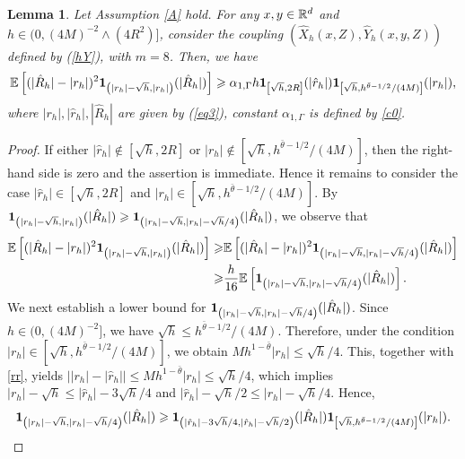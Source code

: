 \documentclass[aap]{imsart}
\theoremstyle{plain}
\newtheorem{lemma}[theorem]{Lemma}
\theoremstyle{definition}
\begin{document}
\begin{lemma}\label{2mom}
Let Assumption \ref{A} hold. For any $x, y\in\mathbb{R}^d$ and $h\in (0, (4M)^{-2}\wedge (4R^2)]$, consider the coupling $(\hat{X}_h(x,Z), \hat{Y}_h(x, y,Z))$ defined by (\ref{hY}), with \(m=8\). Then, we have
$$\mathbb{E}\left[(|\hat{R}_h|-|r_h|)^2{\bf 1}_{\left(|r_h|-\sqrt{h},|r_h|\right)}(|\hat{R}_h|)\right]\geqslant \alpha_{1, \Gamma}h{\bf 1}_{\left[\sqrt{h}, 2R\right]}(|\hat{r}_h|){\bf 1}_{\left[\sqrt{h}, h^{\bar{\theta}-1/2}/(4M)\right]}(|r_h|),$$
where $|r_h|, |\hat{r}_h|, |\hat{R}_h|$ are given by (\ref{eq3}), constant \(\alpha_{1,\Gamma}\) is defined by \eqref{c0}.
\end{lemma}
\begin{proof}
If either \(|\hat r_h|\notin[\sqrt h,2R]\) or \(|r_h|\notin[\sqrt h,h^{\bar\theta-1/2}/(4M)]\),
then the right-hand side is zero and the assertion is immediate. Hence it remains to consider the case \(|\hat r_h|\in[\sqrt h,2R]\) and \(|r_h|\in[\sqrt h,h^{\bar\theta-1/2}/(4M)]\).
By \({\bf 1}_{\left(|r_h|-\sqrt{h}, |r_h|\right)}(|\hat{R}_h|)\geqslant {\bf 1}_{\left(|r_h|-\sqrt{h}, |r_h|-\sqrt{h}/4\right)}(|\hat{R}_h|)\), we observe that
\begin{equation}\label{ST1} 
\begin{aligned}
\mathbb{E} \left[(|\hat{R}_h|-|r_h|)^2{\bf 1}_{\left(|r_h|-\sqrt{h}, |r_h|\right)}(|\hat{R}_h|)\right]\geqslant& \mathbb{E} \left[(|\hat{R}_h|-|r_h|)^2{\bf 1}_{\left(|r_h|-\sqrt{h}, |r_h|-\sqrt{h}/4\right)}(|\hat{R}_h|)\right]\\
\geqslant &\frac{h}{16}\mathbb{E} \left[{\bf 1}_{\left(|r_h|-\sqrt{h}, |r_h|-\sqrt{h}/4\right)}(|\hat{R}_h|)\right].
\end{aligned}
\end{equation}			 
We next establish a lower bound for \({\bf 1}_{\left(|r_h|-\sqrt{h}, |r_h|-\sqrt{h}/4\right)}(|\hat{R}_h|)\). Since $h\in(0, (4M)^{-2}]$, we have $\sqrt{h}\leqslant h^{\bar{\theta}-1/2}/(4M)$. Therefore, under the condition $|r_h|\in[\sqrt{h}, h^{\bar{\theta}-1/2}/(4M)]$, we obtain $Mh^{1-\bar{\theta}}|r_h|\leqslant \sqrt{h}/4$. This, together with \eqref{rr}, yields \(\left||r_h|-|\hat{r}_h|\right|\leqslant Mh^{1-\bar{\theta}}|r_h|\leqslant \sqrt{h}/4\),
which implies \(|r_h|-\sqrt{h}\leqslant|\hat{r}_h|-3\sqrt{h}/4\) and \(|\hat{r}_h|-\sqrt{h}/2\leqslant |r_h|-\sqrt{h}/4\).
Hence, 
\begin{equation}\label{ST2}
\1_{\left(|r_h|-\sqrt{h}, |r_h|-\sqrt{h}/4\right)}(|\hat{R}_h|)\geqslant \1_{\left(|\hat{r}_h|-3\sqrt{h}/4, |\hat{r}_h|-\sqrt{h}/2\right)}(|\hat{R}_h|)\1_{\left[\sqrt{h}, h^{\bar{\theta}-1/2}/(4M)\right]}(|r_h|).

\end{equation}
\end{proof}
\end{document}
